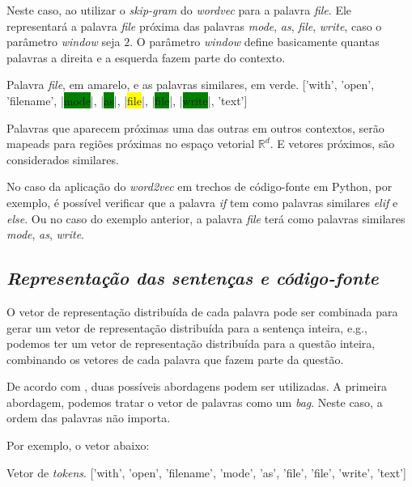 Neste caso, ao utilizar o \textit{skip-gram} do \textit{wordvec} para a palavra \emph{file}. Ele representará a palavra \emph{file} próxima das palavras \emph{mode}, \emph{as}, \emph{file}, \emph{write}, caso o parâmetro \textit{window} seja $2$. O parâmetro \textit{window} define basicamente quantas palavras a direita e a esquerda fazem parte do contexto.

\begin{mypythonembedding}{Palavra \textit{file}, em amarelo, e as palavras similares, em verde.}
  ['with', 'open', 'filename', |\colorbox{green}{mode}|, |\colorbox{green}{as}|, |\colorbox{yellow}{file}|, |\colorbox{green}{file}|, |\colorbox{green}{write}|, 'text']
\end{mypythonembedding}

Palavras que aparecem próximas uma das outras em outros contextos, serão mapeads para regiões próximas no espaço vetorial $\mathbb{R}^{d}$. E vetores próximos, são considerados similares. 

No caso da aplicação do \textit{word2vec} em trechos de código-fonte em Python, por exemplo, é possível verificar que a palavra \emph{if} tem como palavras similares \emph{elif} e \emph{else}. Ou no caso do exemplo anterior, a palavra \emph{file} terá como palavras similares \emph{mode}, \emph{as}, \emph{write}.


\subsection{\textit{Representação das sentenças e código-fonte}}

O vetor de representação distribuída de cada palavra pode ser combinada para gerar um vetor de representação distribuída para a sentença inteira, e.g., podemos ter um vetor de representação distribuída para a questão inteira, combinando os vetores de cada palavra que fazem parte da questão.

De acordo com \cite{cambronero-deep-learning-code-search:2019}, duas possíveis abordagens podem ser utilizadas. A primeira abordagem, podemos tratar o vetor de palavras como um \textit{bag}. Neste caso, a ordem das palavras não importa.

Por exemplo, o vetor abaixo:

\begin{mypythonembedding}{Vetor de \textit{tokens}.}
  ['with', 'open', 'filename', 'mode', 'as', 'file', 'file', 'write', 'text']
\end{mypythonembedding}

